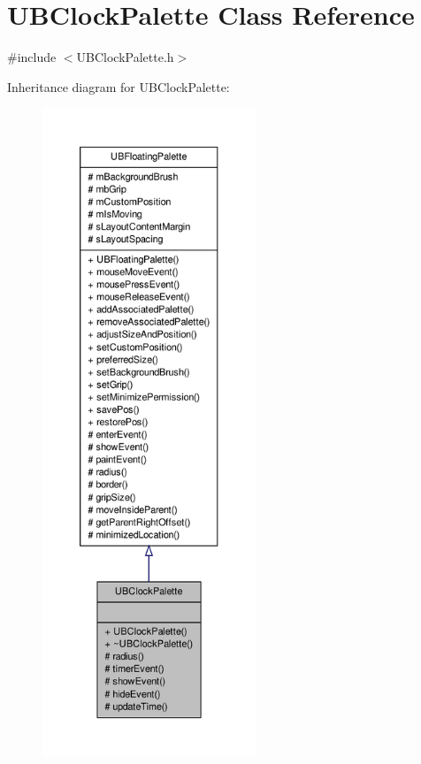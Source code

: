 \hypertarget{class_u_b_clock_palette}{\section{U\-B\-Clock\-Palette Class Reference}
\label{d2/dbd/class_u_b_clock_palette}
}


{\ttfamily \#include $<$U\-B\-Clock\-Palette.\-h$>$}



Inheritance diagram for U\-B\-Clock\-Palette\-:
\nopagebreak
\begin{figure}[H]
\begin{center}
\leavevmode
\includegraphics[height=550pt]{dc/d9c/class_u_b_clock_palette__inherit__graph}
\end{center}
\end{figure}


